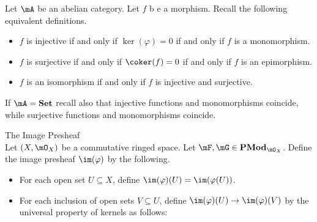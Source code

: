 \documentclass[a4paper]{article}
\begin{document}
Let $\mA$ be an abelian category. Let $f$ b e a morphism. Recall the following equivalent definitions. 
\begin{itemize}
\item $f$ is injective if and only if $\ker(\varphi)=0$ if and only if $f$ is a monomorphism. 
\item $f$ is surjective if and only if $\coker(f)=0$ if and only if $f$ is an epimorphism. 
\item $f$ is an isomorphism if and only if $f$ is injective and surjective. 
\end{itemize}
If $\mA=\bold{Set}$ recall also that injective functions and monomorphisms coincide, while surjective functions and monomorphisms coincide. 

\begin{defn}{The Image Presheaf}{}\\
Let $(X,\mO_X)$ be a commutative ringed space. Let $\mF,\mG\in\bold{PMod}_{\mO_X}$. Define the image presheaf $\im(\varphi)$ by the following. 
\begin{itemize}
\item For each open set $U\subseteq X$, define $\im(\varphi)(U)=\im(\varphi(U))$. 
\item For each inclusion of open sets $V\subseteq U$, define $\im(\varphi)(U)\to\im(\varphi)(V)$ by the universal property of kernels as follows: \\
 \\~\\
\end{itemize}
\end{defn}
\end{document}
